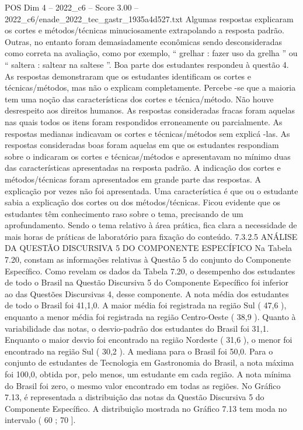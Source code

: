 \begin{textsample}{POS Dim 4 – 2022\_c6 – Score 3.00 – 2022\_c6/enade\_2022\_tec\_gastr\_1935a4d527.txt}
Algumas respostas explicaram os cortes e métodos/técnicas minuciosamente extrapolando a resposta padrão.
Outras, no entanto foram demasiadamente econômicas sendo desconsideradas como correta na avaliação, como por exemplo, “ grelhar : fazer uso da grelha ” ou “ saltera : saltear na saltese ”.
Boa parte dos estudantes respondeu à questão 4.
As respostas demonstraram que os estudantes identificam os cortes e técnicas/métodos, mas não o explicam completamente.
Percebe -se que a maioria tem uma noção das características dos cortes e técnica/método.
Não houve desrespeito aos direitos humanos.
As respostas consideradas fracas foram aquelas nas quais todos os itens foram respondidos erroneamente ou parcialmente.
As respostas medianas indicavam os cortes e técnicas/métodos sem explicá -las.
As respostas consideradas boas foram aquelas em que os estudantes respondiam sobre o indicaram os cortes e técnicas/métodos e apresentavam no mínimo duas das características apresentadas na resposta padrão.
A indicação dos cortes e métodos/técnicas foram apresentados em grande parte das respostas.
A explicação por vezes não foi apresentada.
Uma característica é que ou o estudante sabia a explicação dos cortes ou dos métodos/técnicas.
Ficou evidente que os estudantes têm conhecimento raso sobre o tema, precisando de um aprofundamento.
Sendo o tema relativo à área prática, fica clara a necessidade de mais horas de práticas de laboratório para fixação do conteúdo. 7.3.2.5 ANÁLISE DA QUESTÃO DISCURSIVA 5 DO COMPONENTE ESPECÍFICO Na Tabela 7.20, constam as informações relativas à Questão 5 do conjunto do Componente Específico.
Como revelam os dados da Tabela 7.20, o desempenho dos estudantes de todo o Brasil na Questão Discursiva 5 do Componente Específico foi inferior ao das Questões Discursivas 4, desse componente.
A nota média dos estudantes de todo o Brasil foi 41,1,0.
A maior média foi registrada na região Sul ( 47,6 ), enquanto a menor média foi registrada na região Centro-Oeste ( 38,9 ).
Quanto à variabilidade das notas, o desvio-padrão dos estudantes do Brasil foi 31,1.
Enquanto o maior desvio foi encontrado na região Nordeste ( 31,6 ), o menor foi encontrado na região Sul ( 30,2 ).
A mediana para o Brasil foi 50,0.
Para o conjunto de estudantes de Tecnologia em Gastronomia do Brasil, a nota máxima foi 100,0, obtida por, pelo menos, um estudante em cada região.
A nota mínima do Brasil foi zero, o mesmo valor encontrado em todas as regiões.
No Gráfico 7.13, é representada a distribuição das notas da Questão Discursiva 5 do Componente Específico.
A distribuição mostrada no Gráfico 7.13 tem moda no intervalo ( 60 ; 70 ].

\end{textsample}
